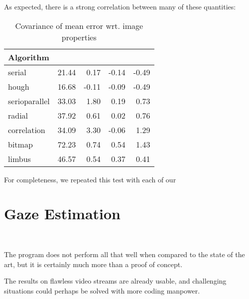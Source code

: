 As expected, there is a strong correlation between many of these quantities:
\begin{table}[h]
\centering
\begin{tabular}{l@{\hspace{1.5cm}}D{.}{.}{3.2}D{.}{.}{3.2}D{.}{.}{3.2}D{.}{.}{3.2}}
\toprule
\textbf{Algorithm} &  &  &  & \\
\midrule
serial & 21.44 & 0.17 & -0.14 & -0.49\\
hough & 16.68 & -0.11 & -0.09 & -0.49\\
serioparallel & 33.03 & 1.80 & 0.19 & 0.73\\
radial & 37.92 & 0.61 & 0.02 & 0.76\\
correlation & 34.09 & 3.30 & -0.06 & 1.29\\
bitmap & 72.23 & 0.74 & 0.54 & 1.43\\
limbus & 46.57 & 0.54 & 0.37 & 0.41\\
\bottomrule
\end{tabular}
\caption{Covariance of mean error wrt. image properties}\label{t:algo-covar}
\end{table}

For completeness, we repeated this test with each of our 

\section{Gaze Estimation}
\\

The program does not perform all that well when compared to the state of the art, but it is certainly much more than a proof of concept.

The results on flawless video streams are already usable, and challenging situations could perhaps be solved with more coding manpower.
\todo{\dots}
